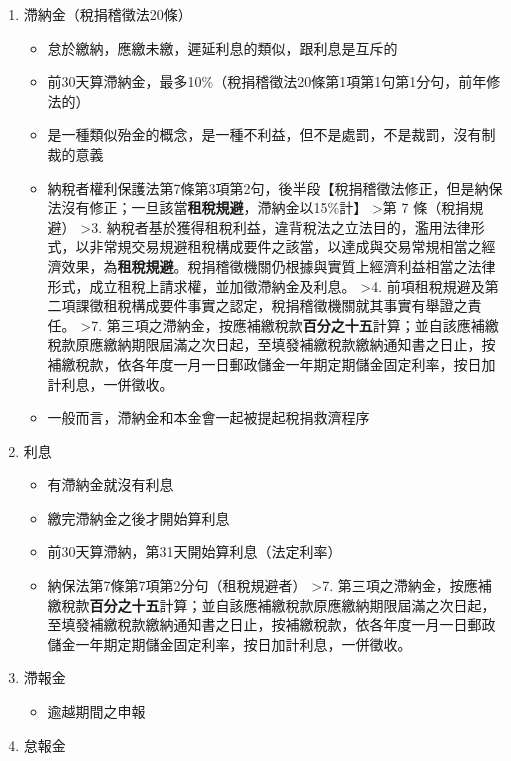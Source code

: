 \documentclass[]{ctexbook}
\providecommand{\tightlist}{%
  \setlength{\itemsep}{0pt}\setlength{\parskip}{0pt}}
\begin{document}
\begin{enumerate}
\def\labelenumi{\arabic{enumi}.}
\tightlist
\item
  滯納金（稅捐稽徵法20條）

  \begin{itemize}
  \tightlist
  \item
    怠於繳納，應繳未繳，遲延利息的類似，跟利息是互斥的
  \item
    前30天算滯納金，最多10\%（稅捐稽徵法20條第1項第1句第1分句，前年修法的）
  \item
    是一種類似殆金的概念，是一種不利益，但不是處罰，不是裁罰，沒有制裁的意義
  \item
    納稅者權利保護法第7條第3項第2句，後半段【稅捐稽徵法修正，但是納保法沒有修正；一旦該當\textbf{租稅規避}，滯納金以15\%計】
    \textgreater 第 7 條（稅捐規避）
    \textgreater3. 納稅者基於獲得租稅利益，違背稅法之立法目的，濫用法律形式，以非常規交易規避租稅構成要件之該當，以達成與交易常規相當之經濟效果，為\textbf{租稅規避}。稅捐稽徵機關仍根據與實質上經濟利益相當之法律形式，成立租稅上請求權，並加徵滯納金及利息。
    \textgreater4. 前項租稅規避及第二項課徵租稅構成要件事實之認定，稅捐稽徵機關就其事實有舉證之責任。
    \textgreater7. 第三項之滯納金，按應補繳稅款\textbf{百分之十五}計算；並自該應補繳稅款原應繳納期限屆滿之次日起，至填發補繳稅款繳納通知書之日止，按補繳稅款，依各年度一月一日郵政儲金一年期定期儲金固定利率，按日加計利息，一併徵收。
  \item
    一般而言，滯納金和本金會一起被提起稅捐救濟程序
  \end{itemize}
\item
  利息

  \begin{itemize}
  \tightlist
  \item
    有滯納金就沒有利息
  \item
    繳完滯納金之後才開始算利息
  \item
    前30天算滯納，第31天開始算利息（法定利率）
  \item
    納保法第7條第7項第2分句（租稅規避者）
    \textgreater7. 第三項之滯納金，按應補繳稅款\textbf{百分之十五}計算；並自該應補繳稅款原應繳納期限屆滿之次日起，至填發補繳稅款繳納通知書之日止，按補繳稅款，依各年度一月一日郵政儲金一年期定期儲金固定利率，按日加計利息，一併徵收。
  \end{itemize}
\item
  滯報金

  \begin{itemize}
  \tightlist
  \item
    逾越期間之申報
  \end{itemize}
\item
  怠報金


\end{enumerate}
\end{document}
